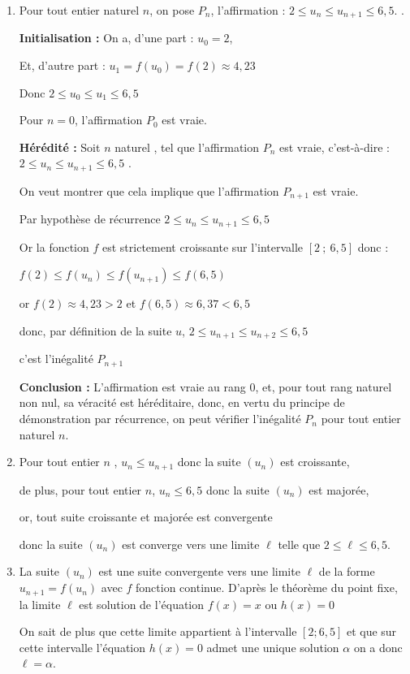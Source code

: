 \begin{enumerate}
\item Pour tout entier naturel  $n$, on pose $P_n$, l'affirmation : \og $2 \leqslant u_{n} \leqslant u_{n+1} \leqslant 6,5$. \fg{}.

\textbf{Initialisation :} On a, d'une part : $u_0 =2 $,

Et, d'autre part : $u_1=f(u_0)=f(2)\approx 4,23$

Donc $2 \leqslant u_0 \leqslant u_1 \leqslant 6,5$

Pour $n = 0$, l'affirmation $P_0$ est vraie.

\textbf{Hérédité :} Soit $n$ naturel , tel que  l'affirmation $P_n$  est vraie, c'est-à-dire : \quad \og $2 \leqslant u_{n} \leqslant u_{n+1} \leqslant 6,5$ \fg{}.

On veut montrer que cela implique que l'affirmation $ P_{n+1} $ est vraie.

Par hypothèse de récurrence $2 \leqslant u_{n} \leqslant u_{n+1} \leqslant 6,5$ 

Or la fonction $f$ est strictement croissante sur l'intervalle $[2~;~6,5]$ donc :

$f(2) \leqslant f\left( u_{n} \right) \leqslant f\left( u_{n+1} \right) \leqslant f(6,5)$ 

or $f(2) \approx 4,23 >2$ et $f(6,5) \approx 6,37 < 6,5$

donc, par définition de la suite $u$, $  2 \leqslant u_{n+1} \leqslant u_{n+2} \leqslant 6,5$

c'est l'inégalité  $P_{n+1}$

\textbf{Conclusion :} L'affirmation est vraie au rang 0, et, pour tout rang naturel non nul, sa véracité est héréditaire, donc, en vertu du principe de démonstration par récurrence, on peut vérifier l'inégalité $ P_n $ pour tout entier naturel $n$.
\item Pour tout entier $n$ , $u_n \leqslant u_{n+1}$ donc la suite $(u_n)$ est croissante, 

de plus, pour tout entier $n$, $u_n \leqslant 6,5$ donc la suite $(u_n)$ est majorée, 

or, tout suite croissante et majorée est convergente

donc la suite $\left(u_{n}\right)$ est converge vers une limite $\ell$ telle que $2 \leqslant \ell \leqslant 6,5$.
\item La suite $(u_n)$ est une suite convergente vers une limite $\ell$ de la forme $u_{n+1}=f\left(u_{n}\right)$ avec $f$ fonction continue. 
D'après le théorème du point fixe, la limite $\ell$ est solution de l'équation $f(x)=x$ ou $h(x)=0$ 

On sait de plus que cette limite appartient à l'intervalle $[2;6,5]$ et que sur cette intervalle l'équation $h(x)=0$ admet une unique solution $\alpha$ on a donc $\ell =\alpha$.

\end{enumerate}

\medskip
